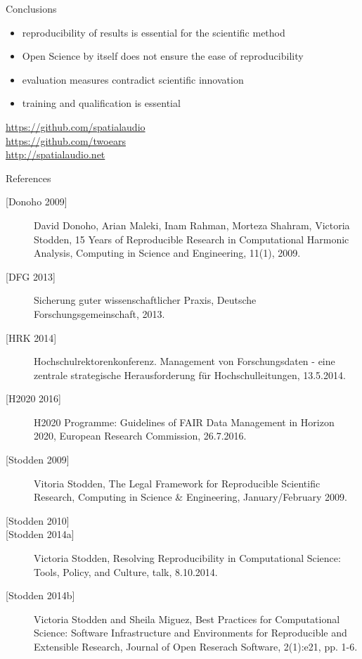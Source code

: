 \documentclass{beamer}
\begin{document}
\begin{frame}{Conclusions}

\begin{itemize}
\item reproducibility of results is essential for the scientific method
\item Open Science by itself does not ensure the ease of reproducibility
\item evaluation measures contradict scientific innovation
\item training and qualification is essential
\end{itemize}

\vfill

{\large
\url{https://github.com/spatialaudio}\\[1ex]
\url{https://github.com/twoears}\\[1ex]
\url{http://spatialaudio.net}
}

\end{frame}


\begin{frame}{References}

{\scriptsize
\begin{description}
\item[{[Donoho 2009]}] David Donoho, Arian Maleki, Inam Rahman, Morteza Shahram, Victoria Stodden, 15 Years of Reproducible Research in Computational Harmonic Analysis, Computing in Science and Engineering, 11(1), 2009.
\item[{[DFG 2013]}] Sicherung guter wissenschaftlicher Praxis, Deutsche Forschungsgemeinschaft, 2013. 
\item[{[HRK 2014]}] Hochschulrektorenkonferenz. Management von Forschungsdaten - eine zentrale strategische Herausforderung für Hochschulleitungen, 13.5.2014.
\item[{[H2020 2016]}] H2020 Programme: Guidelines of FAIR Data Management in Horizon 2020, European Research Commission, 26.7.2016.
\item[{[Stodden 2009]}] Vitoria Stodden, The Legal Framework for Reproducible Scientific Research, Computing in Science \& Engineering, January/February 2009.
\item[{[Stodden 2010]}]
\item[{[Stodden 2014a]}] Victoria Stodden, Resolving Reproducibility in Computational Science: Tools, Policy, and Culture, talk, 8.10.2014.
\item[{[Stodden 2014b]}] Victoria Stodden and Sheila Miguez, Best Practices for Computational Science: Software Infrastructure and Environments for Reproducible and Extensible Research, Journal of Open Reserach Software, 2(1):e21, pp. 1-6.


\end{description}
}

\end{frame}
\end{document}
